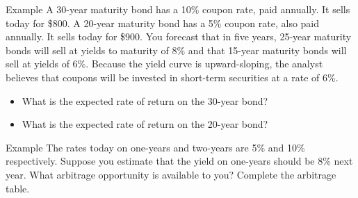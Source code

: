 \documentclass{beamer}
\begin{document}
\begin{frame}{Example}
    A 30-year maturity bond has a 10\% coupon rate, paid annually. It sells today for \$800. A 20-year maturity bond has a 5\% coupon rate, also paid annually. It sells today for \$900. You forecast that in five years, 25-year maturity bonds will sell at yields to maturity of 8\% and that 15-year maturity bonds will sell at yields of 6\%. Because the yield curve is upward-sloping, the analyst believes that coupons will be invested in short-term securities at a rate of 6\%.
    \begin{itemize}
    \item What is the expected rate of return on the 30-year bond?
    \item What is the expected rate of return on the 20-year bond? 
    \end{itemize}
\end{frame}

\begin{frame}{Example}
    The rates today on one-years and two-years are 5\% and 10\% respectively. Suppose you estimate that the yield on one-years should be 8\% next year. What arbitrage opportunity is available to you? Complete the arbitrage table. 
\end{frame}
\end{document}
